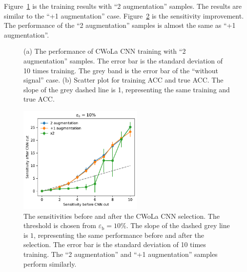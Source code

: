 \documentclass[12pt]{article}
\begin{document}
		Figure~\ref{fig:cwola_cnn_training_performance_only_aug_2} is the training results with ``2 augmentation'' samples. The results are similar to the ``+1 augmentation'' case. Figure~\ref{fig:sensitivity_improvement_bkg_eff_01_only_aug_2} is the sensitivity improvement. The performance of the ``2 augmentation'' samples is almost the same as ``+1 augmentation''.
		\begin{figure}[htpb]
			\centering
			\caption{(a) The performance of CWoLa CNN training with ``2 augmentation'' samples. The error bar is the standard deviation of 10 times training. The grey band is the error bar of the ``without signal'' case. (b) Scatter plot for training ACC and true ACC. The slope of the grey dashed line is 1, representing the same training and true ACC.}
			\label{fig:cwola_cnn_training_performance_only_aug_2}
		\end{figure}
		\begin{figure}[htpb]
			\centering
			\includegraphics[width=0.55\textwidth]{HVmodel_sensitivity_improvement_bkg_eff_10_only_aug_2.pdf}
			\caption{The sensitivities before and after the CWoLa CNN selection. The threshold is chosen from $\varepsilon_{\text{b}} = 10\%$. The slope of the dashed grey line is $1$, representing the same performance before and after the selection. The error bar is the standard deviation of 10 times training. The ``2 augmentation'' and ``+1 augmentation'' samples perform similarly.}
			\label{fig:sensitivity_improvement_bkg_eff_01_only_aug_2}
		\end{figure}
\end{document}

